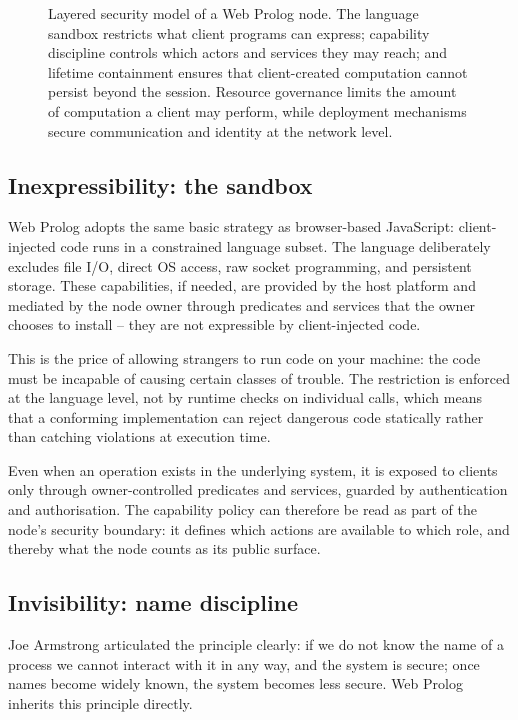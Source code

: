 \begin{figure}[ht]
\begin{minipage}{0.9\linewidth}
\end{minipage}

\vspace{0.5em}\caption{Layered security model of a Web Prolog node. The language sandbox restricts what client programs can express;
capability discipline controls which actors and services they may
reach; and lifetime containment ensures that client-created
computation cannot persist beyond the session. Resource governance limits the amount of computation a client may perform, while deployment mechanisms secure communication and identity at the network level.}
\label{fig:web-prolog-security-trinity}
\end{figure}


\subsection{Inexpressibility: the sandbox}\label{sec:inexpressibility}

Web Prolog adopts the same basic strategy as browser-based
JavaScript: client-injected code runs in a constrained language
subset. The language deliberately excludes file I/O, direct OS
access, raw socket programming, and persistent storage. These
capabilities, if needed, are provided by the host platform and
mediated by the node owner through predicates and services that the
owner chooses to install -- they are not expressible by
client-injected code.

This is the price of allowing strangers to run code on your machine:
the code must be incapable of causing certain classes of trouble.
The restriction is enforced at the language level, not by runtime
checks on individual calls, which means that a conforming
implementation can reject dangerous code statically rather than
catching violations at execution time.

Even when an operation exists in the underlying system, it is
exposed to clients only through owner-controlled predicates and
services, guarded by authentication and authorisation. The capability policy can therefore be read as part of the node's
security boundary: it defines which actions are available to which
role, and thereby what the node counts as its public surface.


\subsection{Invisibility: name discipline}\label{sec:invisibility}

Joe Armstrong articulated the principle clearly: if we do not know
the name of a process we cannot interact with it in any way, and the
system is secure; once names become widely known, the system becomes
less secure. Web Prolog inherits this principle directly.

